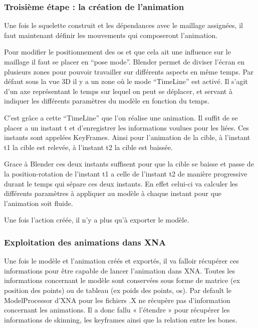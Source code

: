 \documentclass[11pt]{report}
\begin{document}
\subsubsection{Troisième étape : la création de l’animation}

Une fois le squelette construit et les dépendances avec le maillage assignées, il faut maintenant définir les mouvements qui composeront l’animation.

Pour modifier le positionnement des os et que cela ait une influence sur le maillage il faut se placer en ``pose mode''.  Blender permet de diviser l’écran en plusieurs zones pour pouvoir travailler sur différents aspects en même temps. Par défaut sous la vue 3D il y a un zone où le mode ``TimeLine'' est activé. Il s’agit d’un axe représentant le temps sur lequel on peut se déplacer, et servant à indiquer les différents paramètres du modèle en fonction du temps.

C’est grâce a cette ``TimeLine'' que l’on réalise une animation. Il suffit de se placer a un instant t et d’enregistrer les informations voulues pour les liées. Ces instants sont appelées KeyFrames. Ainsi pour l’animation de la cible, à l’instant t1 la cible est relevée, à l’instant t2 la cible est baissée.

Grace à Blender ces deux instants suffisent pour que la cible se baisse et passe de la position-rotation de l’instant t1 a celle de l’instant t2 de manière progressive durant le temps qui sépare ces deux instants. En effet celui-ci va calculer les différents paramètres  à appliquer au modèle à chaque instant pour que l’animation soit fluide.

Une fois l’action créée, il n’y a plus qu’à exporter le modèle.

\subsubsection{Exploitation des animations dans XNA}

Une fois le modèle et l’animation créés et exportés, il va falloir récupérer ces informations pour être capable de lancer l’animation dans XNA. Toutes les informations concernant le modèle sont conservées sous forme de matrice (ex position des points) ou de tableau (ex poids des points, os). 
Par default le ModelProcessor d’XNA pour les fichiers .X ne récupère pas d’information concernant les animations. Il a donc fallu « l’étendre » pour récupérer les informations de skinning, les  keyframes ainsi que la relation entre les bones.
\end{document}
